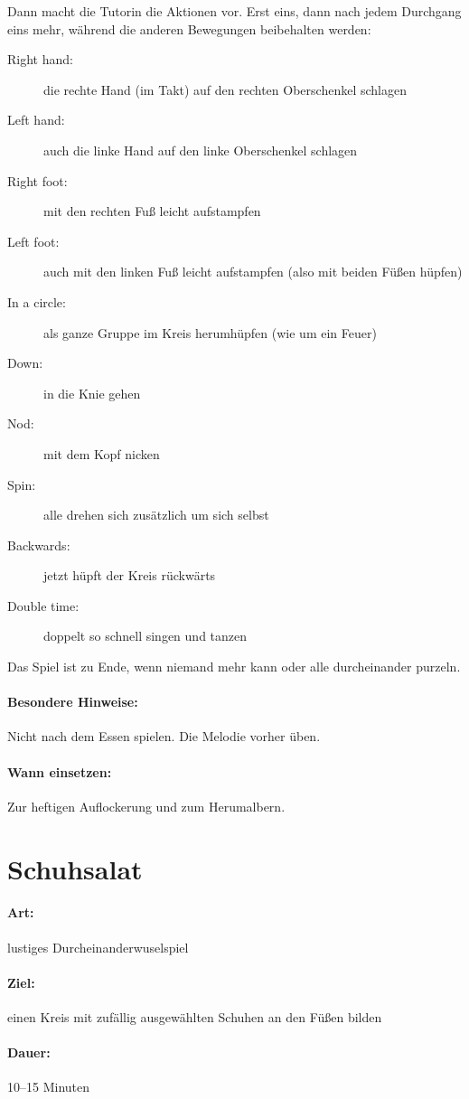 Dann macht die Tutorin die Aktionen vor. Erst eins, dann nach jedem Durchgang eins mehr, während die anderen Bewegungen beibehalten werden:
\begin{description}
  \item[Right hand:] die rechte Hand (im Takt) auf den rechten Oberschenkel schlagen
  \item[Left hand:] auch die linke Hand auf den linke Oberschenkel schlagen
  \item[Right foot:] mit den rechten Fuß leicht aufstampfen
  \item[Left foot:] auch mit den linken Fuß leicht aufstampfen (also mit beiden Füßen hüpfen)
  \item[In a circle:]  als ganze Gruppe im Kreis herumhüpfen (wie um ein Feuer)
  \item[Down:] in die Knie gehen
  \item[Nod:] mit dem Kopf nicken
  \item[Spin:] alle drehen sich zusätzlich um sich selbst
  \item[Backwards:] jetzt hüpft der Kreis rückwärts
  \item[Double time:] doppelt so schnell singen und tanzen
\end{description}
Das Spiel ist zu Ende, wenn niemand mehr kann oder alle durcheinander purzeln.
\paragraph{Besondere Hinweise:} Nicht nach dem Essen spielen. Die Melodie vorher üben.
\paragraph{Wann einsetzen:} Zur heftigen Auflockerung und zum Herumalbern.

\section{Schuhsalat}
\paragraph{Art:} lustiges Durcheinanderwuselspiel
\paragraph{Ziel:} einen Kreis mit zufällig ausgewählten Schuhen an den Füßen bilden
\paragraph{Dauer:} 10--15 Minuten
